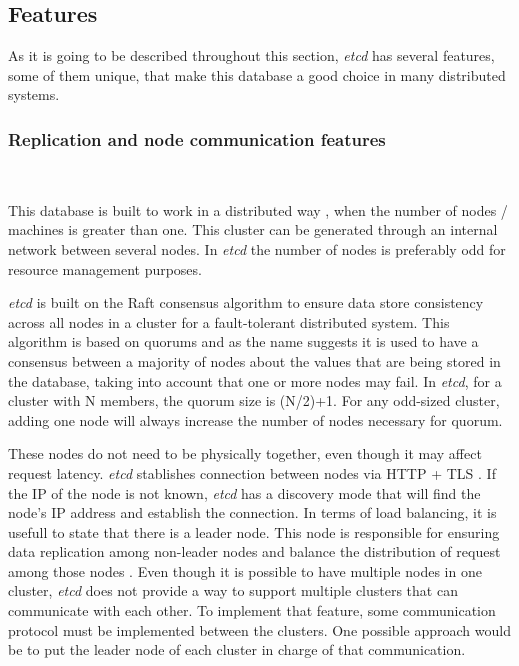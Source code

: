 \documentclass[screen,review]{acmart}
\begin{document}
\subsection{Features}

As it is going to be described throughout this section, \textit{etcd} has several features, some of them unique, that make this database a good choice in many distributed systems.\\

\subsubsection{Replication and node communication features}~\

This database is built to work in a distributed way \cite{etcd_clustering}, when the number of nodes / machines is greater than one. This cluster can be generated through an internal network between several nodes. In \textit{etcd} the number of nodes is preferably odd for resource management purposes.

\textit{etcd}  is built on the Raft consensus algorithm \cite{raft} to ensure data store consistency across all nodes in a cluster for a fault-tolerant distributed system. This algorithm is based on quorums and as the name suggests it is used to have a consensus between a majority of nodes about the values that are being stored in the database, taking into account that one or more nodes may fail. In \textit{etcd}, for a cluster with N members, the quorum size is (N/2)+1. For any odd-sized cluster, adding one node will always increase the number of nodes necessary for quorum.

These nodes do not need to be physically together, even though it may affect request latency. \textit{etcd} stablishes connection between nodes via HTTP + TLS \cite{http}. If the IP of the node is not known, \textit{etcd} has a discovery mode that will find the node's IP address and establish the connection.
In terms of load balancing, it is usefull to state that there is a leader node. This node is responsible for ensuring data replication among non-leader nodes and balance the distribution of request among those nodes \cite{etcd_faq}.
Even though it is possible to have multiple nodes in one cluster, \textit{etcd} does not provide a way to support multiple clusters that can communicate with each other. To implement that feature, some communication protocol must be implemented between the clusters. One possible approach would be to put the leader node of each cluster in charge of that communication.
\end{document}
